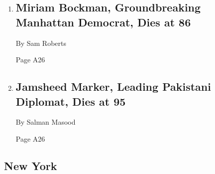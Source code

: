 \begin{enumerate}
\def\labelenumi{\arabic{enumi}.}
\item
  \href{/2018/06/29/obituaries/miriam-bockman-groundbreaking-manhattan-democrat-dies-at-86.html}{}

  \hypertarget{miriam-bockman-groundbreaking-manhattan-democrat-dies-at-86}{%
  \subsection{Miriam Bockman, Groundbreaking Manhattan Democrat, Dies at
  86}\label{miriam-bockman-groundbreaking-manhattan-democrat-dies-at-86}}

  By Sam Roberts

  Page A26
\item
  \href{/2018/06/29/obituaries/jamsheed-marker-leading-pakistani-diplomat-dies-at-95.html}{}

  \hypertarget{jamsheed-marker-leading-pakistani-diplomat-dies-at-95}{%
  \subsection{Jamsheed Marker, Leading Pakistani Diplomat, Dies at
  95}\label{jamsheed-marker-leading-pakistani-diplomat-dies-at-95}}

  By Salman Masood

  Page A26
\end{enumerate}

\hypertarget{new-york}{%
\subsection{New York}\label{new-york}}

